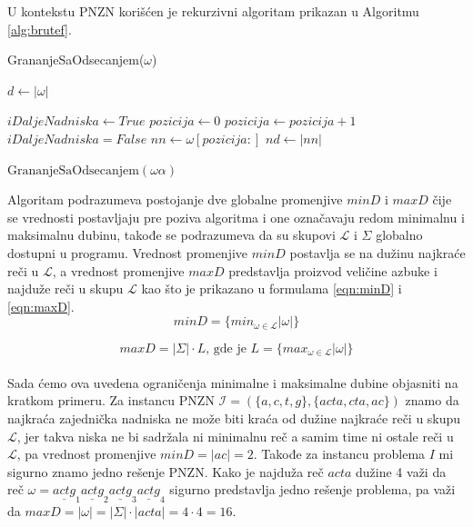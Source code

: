 \documentclass[12pt,oneside]{memoir}
\begin{document}
U kontekstu PNZN korišćen je rekurzivni algoritam prikazan u Algoritmu \ref{alg:brutef}.
\begin{algorithm}
  \caption{\textrm{GrananjeSaOdsecanjem($\omega$)}}
  \label{alg:brutef}
  \begin{algorithmic}[1]
  \State $d \gets |\omega|$ 
      \State \Return
  \EndIf

      \State $iDaljeNadniska \gets True$
      \State $pozicija \gets 0$
       
          \State $pozicija \gets pozicija + 1$
        \Else
          \State $iDaljeNadniska = False$
        \EndIf
      \EndWhile
      \State $nn \gets \omega[pozicija:]$ 
      \State $nd \gets |nn|$ 
  \EndIf

  \For{$\alpha \in \Sigma$} 
        \State $\textrm{GrananjeSaOdsecanjem}(\omega\alpha)$
  \EndFor
  \end{algorithmic}
  \end{algorithm}
Algoritam podrazumeva postojanje dve globalne promenjive $minD$ i $maxD$ čije se vrednosti postavljaju pre
poziva algoritma i one označavaju redom minimalnu i maksimalnu dubinu, takođe se podrazumeva da su skupovi $\mathcal{L}$
i $\Sigma$ globalno dostupni u programu. Vrednost promenjive $minD$ postavlja
se na dužinu najkraće reči u $\mathcal{L}$, a vrednost promenjive $maxD$ predstavlja proizvod veličine azbuke
i najduže reči u skupu $\mathcal{L}$ kao što je prikazano u formulama \ref{eqn:minD} i \ref{eqn:maxD}.
\\
\begin{equation}
  \label{eqn:minD}
  minD=\{min_{\omega\in\mathcal{L}}|\omega|\}
\end{equation}

\begin{equation}
  \label{eqn:maxD}
  maxD=|\Sigma| \cdot L \textrm{, gde je } L=\{max_{\omega\in\mathcal{L}}|\omega|\}
\end{equation}
\\
Sada ćemo ova uvedena ograničenja minimalne i maksimalne dubine objasniti na kratkom primeru.
Za instancu PNZN $\mathcal{I}=(\{a,c,t,g\},\{acta,cta,ac\})$ znamo da najkraća zajednička nadniska
ne može biti kraća od dužine najkraće reči u skupu $\mathcal{L}$, jer takva niska ne bi sadržala ni
minimalnu reč a samim time ni ostale reči u $\mathcal{L}$, pa vrednost promenjive $minD=|ac|=2$. Takođe za 
instancu problema $I$ mi sigurno znamo jedno rešenje PNZN. Kako je najduža reč $acta$ dužine 4 
važi da reč $\omega=\underline{actg}_{1}\underline{actg}_{2}\underline{actg}_{3}\underline{actg}_{4}$
sigurno predstavlja jedno rešenje problema, pa važi da $maxD=|\omega|=|\Sigma|\cdot|acta| = 4 \cdot 4 = 16$.
\end{document}
